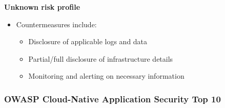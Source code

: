 \textbf{Unknown risk profile}
\begin{itemize}
    \item Countermeasures include:
    \begin{itemize}
        \item Disclosure of applicable logs and data
        \item Partial/full disclosure of infrastructure details
        \item Monitoring and alerting on necessary information
    \end{itemize}
\end{itemize}

\newpage

\subsubsection{OWASP Cloud-Native Application Security Top 10}

